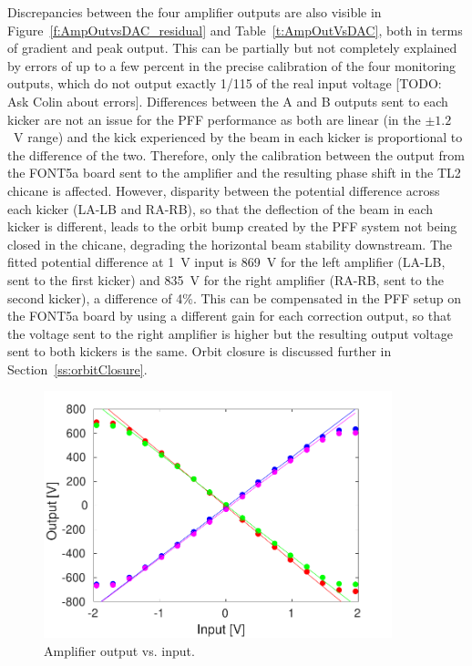 Discrepancies between the four amplifier outputs are also visible in Figure~\ref{f:AmpOutvsDAC_residual} and Table~\ref{t:AmpOutVsDAC}, both in terms of gradient and peak output. This can be partially but not completely explained by errors of up to a few percent in the precise calibration of the four monitoring outputs, which do not output exactly 1/115 of the real input voltage [TODO: Ask Colin about errors]. Differences between the A and B outputs sent to each kicker are not an issue for the PFF performance as both are linear (in the \(\pm1.2\)~V range) and the kick experienced by the beam in each kicker is proportional to the difference of the two. Therefore, only the calibration between the output from the FONT5a board sent to the amplifier and the resulting phase shift in the TL2 chicane is affected. However, disparity between the potential difference across each kicker (LA-LB and RA-RB), so that the deflection of the beam in each kicker is different, leads to the orbit bump created by the PFF system not being closed in the chicane, degrading the horizontal beam stability downstream. The fitted potential difference at 1~V input is 869~V for the left amplifier (LA-LB, sent to the first kicker) and 835~V for the right amplifier (RA-RB, sent to the second kicker), a difference of 4\%. This can be compensated in the PFF setup on the FONT5a board by using a different gain for each correction output, so that the voltage sent to the right amplifier is higher but the resulting output voltage sent to both kickers is the same. Orbit closure is discussed further in Section~\ref{ss:orbitClosure}.


\begin{figure}
  \centering
  \includegraphics[width=0.9\textwidth]{Figures/commissioning/AmpOutvsDAC}
  \caption{Amplifier output vs. input.}
  \label{f:AmpOutvsDAC}
\end{figure}

